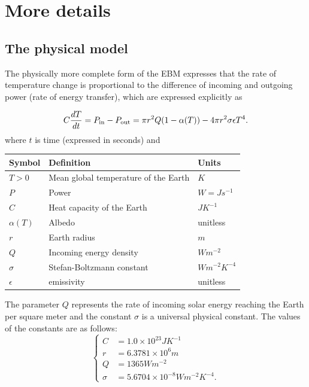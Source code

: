 \documentclass[10pt, letterpaper, answer]{exam}
\begin{document}
\newpage 

\section{More details}

\subsection{The physical model
}
The physically more complete form of the EBM expresses that the rate of temperature change is proportional to the difference of incoming and outgoing power (rate of energy transfer), which are expressed explicitly as

\begin{equation}
    C \frac{d T}{d t} = P_{\rm in} - P_{\rm out} = \pi r^2 Q (1-\alpha(T)) - 4 \pi r^2 \sigma \epsilon T^4.
\end{equation}
where $t$ is time (expressed in seconds) and 
\begin{center}
\begin{tabular}{ l | l | l }
Symbol & Definition & Units \\
\hline \hline
$T > 0$ & Mean global temperature of the Earth & $K$ \\
$P$ & Power & $W=J s^{-1}$ \\
$C$ & Heat capacity of the Earth & $J K^{-1}$\\  
$\alpha(T)$ & Albedo & unitless \\
$r$ & Earth radius & $m$ \\
$Q$ & Incoming energy density & $W m^{-2}$ \\
$\sigma$ & Stefan-Boltzmann constant & $Wm^{-2}K^{-4}$ \\
$\epsilon$ & emissivity & unitless
\end{tabular}
\end{center}

The parameter $Q$ represents the rate of incoming solar energy reaching the Earth per square meter and the constant $\sigma$ is a universal physical constant. The values of the constants are as follows: 
$$
\begin{cases}
    C & = 1.0 \times 10^{23} J K^{-1} \\
    r & = 6.3781 \times 10^{6}m \\
    Q & = 1365 W m^{-2} \\
    \sigma &= 5.6704 \times 10^{-8} W m^{-2} K^{-4}.
\end{cases}
$$
\end{document}
